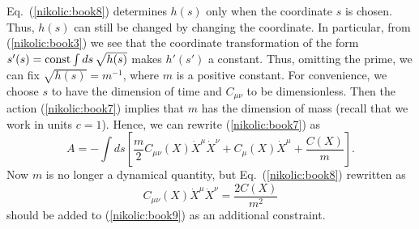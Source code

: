 \documentclass[12pt,twoside]{report} %
\begin{document}
Eq.~(\ref{nikolic:book8}) determines $h(s)$ only when the coordinate $s$ is chosen.
Thus, $h(s)$ can still be changed by changing the coordinate. In particular,
from (\ref{nikolic:book3}) we see that the coordinate transformation of the form
$s'(s)={\rm const}\int ds \, \sqrt{h(s)}$ makes $h'(s')$ a constant.
Thus, omitting the prime, we can fix $\sqrt{h(s)}=m^{-1}$, where $m$ is a positive constant.
For convenience, we choose $s$ to have the dimension of time and $C_{\mu\nu}$ 
to be dimensionless. Then the action (\ref{nikolic:book7}) implies that $m$ has the dimension
of mass (recall that we work in units $c=1$). Hence, we can rewrite (\ref{nikolic:book7})
as
\begin{equation}\label{nikolic:book9}
 A=-\int ds \left[ \frac{m}{2}  C_{\mu\nu}(X)
\dot{X}^{\mu} \dot{X}^{\nu} 
+C_{\mu}(X) \dot{X}^{\mu} + \frac{C(X)}{m} \right] .
\end{equation}
Now $m$ is no longer a dynamical quantity, but Eq.~(\ref{nikolic:book8}) rewritten as
\begin{equation}\label{nikolic:book10}
 C_{\mu\nu}(X)\dot{X}^{\mu}\dot{X}^{\nu}=\frac{2C(X)}{m^2} 
\end{equation}
should be added to (\ref{nikolic:book9}) as an additional constraint.
\end{document}
